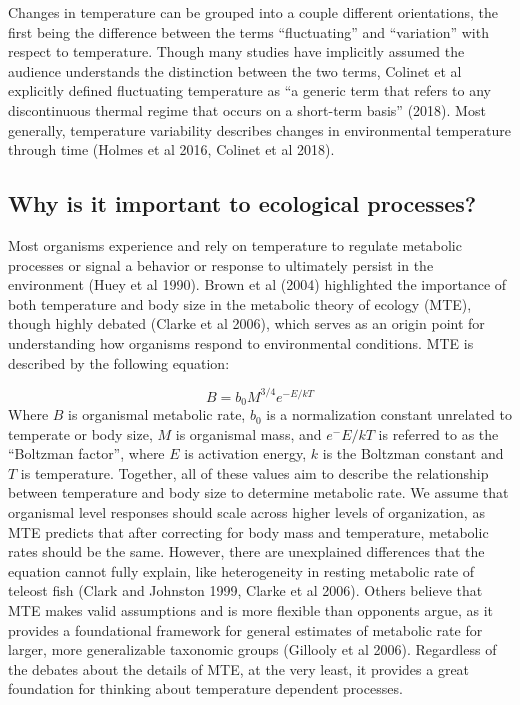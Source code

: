\documentclass[12pt,twoside]{reedthesis}
\begin{document}
Changes in temperature can be grouped into a couple different orientations, the first being the difference between the terms ``fluctuating'' and ``variation'' with respect to temperature. Though many studies have implicitly assumed the audience understands the distinction between the two terms, Colinet et al explicitly defined fluctuating temperature as ``a generic term that refers to any discontinuous thermal regime that occurs on a short-term basis'' (2018). Most generally, temperature variability describes changes in environmental temperature through time (Holmes et al 2016, Colinet et al 2018).

\hypertarget{why-is-it-important-to-ecological-processes}{%
\subsection{Why is it important to ecological processes?}\label{why-is-it-important-to-ecological-processes}}

Most organisms experience and rely on temperature to regulate metabolic processes or signal a behavior or response to ultimately persist in the environment (Huey et al 1990). Brown et al (2004) highlighted the importance of both temperature and body size in the metabolic theory of ecology (MTE), though highly debated (Clarke et al 2006), which serves as an origin point for understanding how organisms respond to environmental conditions. MTE is described by the following equation:

\[
B = b_0M^{3/4}e^{-E/kT}
\]
Where \(B\) is organismal metabolic rate, \(b_0\) is a normalization constant unrelated to temperate or body size, \(M\) is organismal mass, and \(e^-E/kT\) is referred to as the ``Boltzman factor'', where \(E\) is activation energy, \(k\) is the Boltzman constant and \(T\) is temperature. Together, all of these values aim to describe the relationship between temperature and body size to determine metabolic rate. We assume that organismal level responses should scale across higher levels of organization, as MTE predicts that after correcting for body mass and temperature, metabolic rates should be the same. However, there are unexplained differences that the equation cannot fully explain, like heterogeneity in resting metabolic rate of teleost fish (Clark and Johnston 1999, Clarke et al 2006). Others believe that MTE makes valid assumptions and is more flexible than opponents argue, as it provides a foundational framework for general estimates of metabolic rate for larger, more generalizable taxonomic groups (Gillooly et al 2006). Regardless of the debates about the details of MTE, at the very least, it provides a great foundation for thinking about temperature dependent processes.
\end{document}

